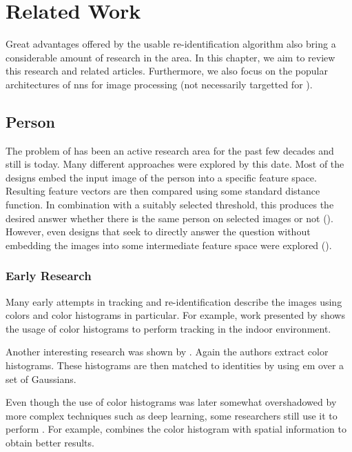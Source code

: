 \chapter{Related Work}

\label{ch:related_work}


Great advantages offered by the usable re-identification algorithm also bring a considerable amount of research in the area. In this chapter, we aim to review this research and related articles. Furthermore, we also focus on the popular architectures of \glspl{nn} for image processing (not necessarily targetted for \reid{}).


\section{Person \Reid{}}

\label{sec:person_reid}

The problem of \reid{} has been an active research area for the past few decades and still is today. Many different approaches were explored by this date. Most of the designs embed the input image of the person into a specific feature space. Resulting feature vectors are then compared using some standard distance function. In combination with a suitably selected threshold, this produces the desired answer whether there is the same person on selected images or not (\cite{cheng2016person}). However, even designs that seek to directly answer the question without embedding the images into some intermediate feature space were explored (\cite{li2014deepreid}).

\subsection{Early Research}
\label{sec:early_research}

Many early attempts in tracking and re-identification describe the images using colors and color histograms in particular. For example, work presented by \cite{krumm2000multi} shows the usage of color histograms to perform tracking in the indoor environment.

Another interesting research was shown by \cite{orwell1999multi}. Again the authors extract color histograms. These histograms are then matched to identities by using \gls{em} over a set of Gaussians.

Even though the use of color histograms was later somewhat overshadowed by more complex techniques such as deep learning, some researchers still use it to perform \reid{}. For example, \cite{zeng2014person} combines the color histogram with spatial information to obtain better results.

